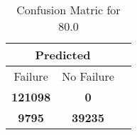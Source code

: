 \begin{table}[] 
\caption{Confusion Matric for 80.0} 
\label{Table: Prediction Accuracy-DMD80.0OnlySunEKF-combinationReflectionperfectNoFailurePrediction-Reflection} 
\centering 
\begin{tabular} 
 {@{}ccc@{}} 
\toprule 
\multicolumn{2}{c}{\textbf{Predicted}}
 \\ \midrule 
\multicolumn{1}{|c|}{Failure} & 
\multicolumn{1}{c|}{No Failure}
 \\ \midrule 
\multicolumn{1}{|c|}{\color{green}\textbf{121098}} & 
\multicolumn{1}{c|}{\color{red}\textbf{0}}
 \\ \midrule 
\multicolumn{1}{|c|}{\color{red}\textbf{9795}} & 
\multicolumn{1}{c|}{\color{green}\textbf{39235}}
 \\ \bottomrule 
\end{tabular} 
\end{table} 
